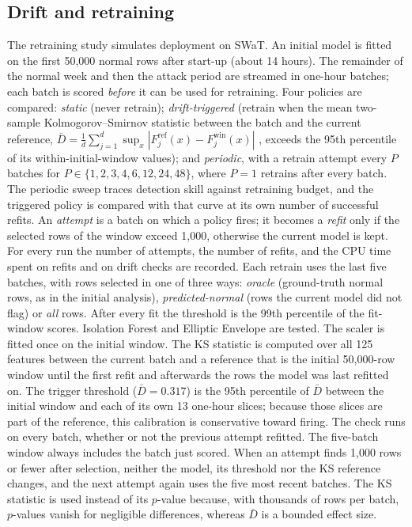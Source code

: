 \documentclass[11pt]{article}
\begin{document}
\subsection{Drift and retraining}
The retraining study simulates deployment on SWaT. An initial model is fitted
on the first 50{,}000 normal rows after start-up (about 14 hours). The
remainder of the normal week and then the attack period are streamed in
one-hour batches; each batch is scored \emph{before} it can be used for
retraining. Four policies are compared: \emph{static} (never retrain);
\emph{drift-triggered} (retrain when the mean two-sample Kolmogorov--Smirnov
statistic between the batch and the current reference,
$\bar D=\frac{1}{d}\sum_{j=1}^{d}\sup_x\left|F^{\mathrm{ref}}_j(x)-F^{\mathrm{win}}_j(x)\right|$
\citep{massey1951}, exceeds the 95th percentile of its within-initial-window
values); and \emph{periodic}, with a retrain attempt every $P$ batches for
$P\in\{1,2,3,4,6,12,24,48\}$, where $P{=}1$ retrains after every batch. The periodic
sweep traces detection skill against retraining budget, and the triggered policy is
compared with that curve at its own number of successful refits. An \emph{attempt} is a
batch on which a policy fires; it becomes a \emph{refit} only if the selected rows of the
window exceed 1{,}000, otherwise the current model is kept. For every run the number of
attempts, the number of refits, and the CPU time spent on refits and on drift checks are
recorded. Each retrain uses the last five batches, with rows selected in one of three ways: \emph{oracle}
(ground-truth normal rows, as in the initial analysis), \emph{predicted-normal}
(rows the current model did not flag) or \emph{all} rows. After every fit the
threshold is the 99th percentile of the fit-window scores. Isolation Forest and
Elliptic Envelope are tested. The scaler is fitted once on the initial window. The KS
statistic is computed over all 125 features between the current batch and a reference
that is the initial 50{,}000-row window until the first refit and afterwards the rows the
model was last refitted on. The trigger threshold ($\bar D{=}0.317$) is the 95th
percentile of $\bar D$ between the initial window and each of its own 13 one-hour slices;
because those slices are part of the reference, this calibration is conservative toward
firing. The check runs on every batch, whether or not the previous attempt refitted. The
five-batch window always includes the batch just scored. When an attempt finds 1{,}000
rows or fewer after selection, neither the model, its threshold nor the KS reference
changes, and the next attempt again uses the five most recent batches.
The KS statistic is used instead of its $p$-value because, with thousands of
rows per batch, $p$-values vanish for negligible differences, whereas $\bar D$
is a bounded effect size.
\end{document}
